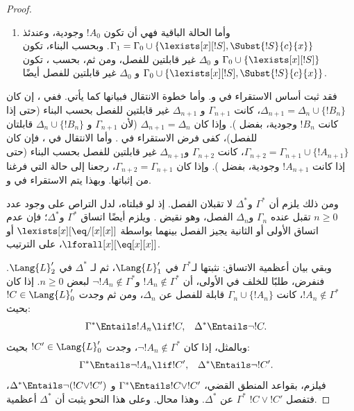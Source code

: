 \documentclass[../../../include/open-logic-section]{subfiles}
\begin{document}
\begin{proof}
\begin{enumerate}
  و$\Delta_0$ غير قابلتين للفصل بحسب البناء.
\item وأما الحالة الباقية فهي أن تكون $!A_0$ وجودية، وعندئذ
  $\Gamma_1=\Gamma_0 \cup \{\lexists[x][!S],\Subst{!S}{c}{x}\}$.
  وبحسب البناء، تكون $\Gamma_0 \cup \{\lexists[x][!S]\}$ و
  $\Delta_0$ غير قابلتين للفصل، ومن ثم، بحسب ،
  تكون $\Gamma_0 \cup \{\lexists[x][!S],\Subst{!S}{c}{x}\}$ و
  $\Delta_0$ غير قابلتين للفصل أيضًا.
\end{enumerate}
فقد ثبت أساس الاستقراء في  و. وأما
خطوة الانتقال فبيانها كما يأتي. ففي ، إن كان
$\Delta_{n+1}=\Delta_n \cup \{!B_n\}$، كانت $\Gamma_{n+1}$ و
$\Delta_{n+1}$ غير قابلتين للفصل بحسب البناء (حتى إذا كانت $!B_n$
وجودية، بفضل ). وإذا كان
$\Delta_{n+1}=\Delta_n$ (لأن $\Gamma_{n+1}$ و
$\Delta_n \cup \{!B_n\}$ قابلتان للفصل)، كفى فرض الاستقراء في
. وأما الانتقال في ، فإن كان
$\Gamma_{n+2}=\Gamma_{n+1} \cup \{!A_{n+1}\}$، كانت $\Gamma_{n+2}$
و$\Delta_{n+1}$ غير قابلتين للفصل بحسب البناء (حتى إذا كانت $!A_{n+1}$
وجودية، بفضل ). وإذا كان
$\Gamma_{n+2}=\Gamma_{n+1}$، رجعنا إلى حالة
 التي فرغنا من إثباتها. وبهذا يتم الاستقراء في
 و.

ومن ذلك يلزم أن $\Gamma^*$ و$\Delta^*$ لا تقبلان الفصل. إذ لو قبلتاه، لدل التراص
على وجود عدد $n \ge 0$ تقبل عنده $\Gamma_n$ و$\Delta_n$ الفصل، وهو نقيض
. ويلزم أيضًا اتساق $\Gamma^*$ و$\Delta^*$؛ فإن
عدم اتساق الأولى أو الثانية يجيز الفصل بينهما بواسطة
$\lexists[x][\eq/[x][x]]$ أو $\lforall[x][\eq[x][x]]$، على الترتيب.

وبقي بيان أعظمية الاتساق: نثبتها لـ$\Gamma^*$ في $\Lang{L}'_1$، ثم لـ
$\Delta^*$ في $\Lang{L}'_2$. فنفرض، طلبًا للخلف في الأولى، أن
$!A_n \notin \Gamma^*$ و$\lnot !A_n \notin \Gamma^*$ لبعض
$n \ge 0$. إذا كان $!A_n \notin \Gamma^*$، كانت
$\Gamma_n \cup \{!A_n\}$ قابلة للفصل عن $\Delta_n$، ومن ثم وجدت
$!C \in \Lang{L}'_0$ بحيث:
\begin{align*}
  \Gamma^* & \Entails !A_n \lif !C, &
  \Delta^* & \Entails \lnot !C.
\end{align*}
وبالمثل، إذا كان $\lnot !A_n \notin \Gamma^*$، وجدت
$!C' \in \Lang{L}'_0$ بحيث:
\begin{align*}
  \Gamma^* & \Entails \lnot !A_n \lif !C', &
  \Delta^* & \Entails \lnot !C'.
\end{align*}
فيلزم، بقواعد المنطق القضي، $\Gamma^* \Entails !C \lor !C'$ و
$\Delta^* \Entails \lnot (!C \lor !C')$، فتفصل $!C \lor !C'$
$\Gamma^*$ عن $\Delta^*$. وهذا محال. وعلى هذا النحو يثبت أن $\Delta^*$ أعظمية.


\end{proof}
\end{document}
